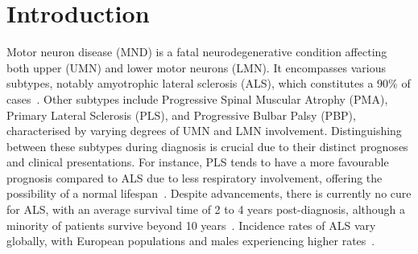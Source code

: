 \chapter{Introduction}
\label{introduction}

%

Motor neuron disease (MND) is a fatal neurodegenerative condition affecting both upper (UMN) and lower motor neurons (LMN).
It encompasses various subtypes, notably amyotrophic lateral sclerosis (ALS), which constitutes a 90\% of cases~\cite{filippiMotorNeuronDiseases2015}.
Other subtypes include Progressive Spinal Muscular Atrophy (PMA), Primary Lateral Sclerosis (PLS), and Progressive Bulbar Palsy (PBP), characterised by varying degrees of UMN and LMN involvement.
Distinguishing between these subtypes during diagnosis is crucial due to their distinct prognoses and clinical presentations.
For instance, PLS tends to have a more favourable prognosis compared to ALS due to less respiratory involvement, offering the possibility of a normal lifespan~\cite{statlandPrimaryLateralSclerosis2015}.
Despite advancements, there is currently no cure for ALS, with an average survival time of 2 to 4 years post-diagnosis, although a minority of patients survive beyond 10 years~\cite{swinnenPhenotypicVariabilityAmyotrophic2014,goutmanRecentAdvancesDiagnosis2022a,pupilloLongtermSurvivalAmyotrophic2014}.
Incidence rates of ALS vary globally, with European populations and males experiencing higher rates~\cite{marinVariationWorldwideIncidence2017,fontanaTimetrendEvolutionDeterminants2021}.


